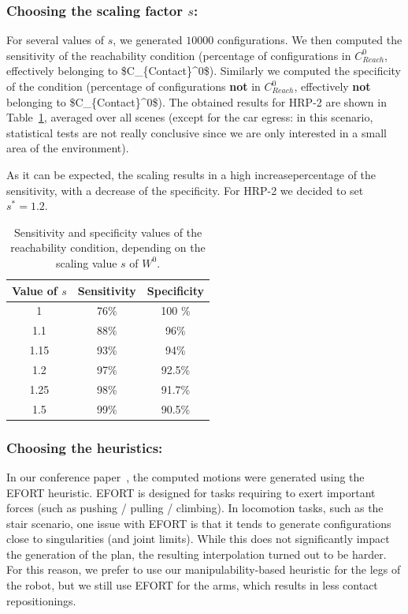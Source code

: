 \subsubsection{Choosing the scaling factor $s$:} \label{sec:params}
For several values of $s$, we generated $10 000$ configurations. 
We then computed the sensitivity of the reachability condition (percentage of configurations in $C_{Reach}^0$, effectively belonging to \gls{$C_{Contact}^0$}).
Similarly we computed the specificity of the condition (percentage of configurations \textbf{not} in $C_{Reach}^0$, effectively \textbf{not} belonging to \gls{$C_{Contact}^0$}).
The obtained results for HRP-2 are shown in Table~\ref{tab:scale}, averaged over all scenes (except for the car egress: in this scenario, 
statistical tests are not really conclusive since we are only interested in a small area of the environment).

As it can be expected, the scaling results in a high increasepercentage of the sensitivity, with a decrease of the specificity.
For HRP-2 we decided to set $s^*=1.2$.

\begin{table}
\centering
\footnotesize
\begin{tabular}{c | c | c}
   Value of $s$ &  Sensitivity & Specificity\\
 \hline
   1   & 76\% & 100 \%\\
   1.1& 88\% & 96\% \\
   1.15& 93\% & 94\%\\
   1.2 & 97\% & 92.5\%\\
   1.25& 98\% & 91.7\%\\
   1.5 & 99\% & 90.5\%\\
 \end{tabular}
\caption{Sensitivity and specificity values of the reachability condition, depending on the scaling value $s$ of $W^0$.}
\label{tab:scale}
\quad
\end{table}

\subsubsection{Choosing the heuristics:} \label{sec:heuristichoices}
In our conference paper~\citep{tonneauisrr15}, the computed motions were generated using the EFORT heuristic.
EFORT is designed for tasks requiring to exert important forces (such as pushing / pulling / climbing). 
In locomotion tasks, such as the stair scenario, one issue with EFORT is that it tends to generate
configurations close to singularities (and joint limits). While this does not significantly impact
the generation of the plan, the resulting interpolation turned out to be harder.
For this reason, we prefer to use our manipulability-based heuristic for the legs of the robot, but we still
use EFORT for the arms, which results in less contact repositionings.

